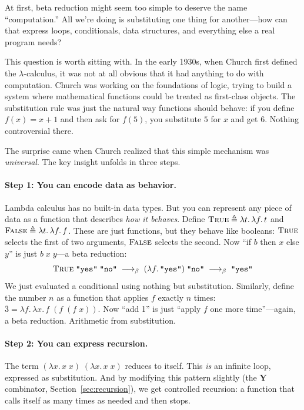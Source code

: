 \documentclass[11pt,a4paper]{article}
\theoremstyle{definition}
\newcommand{\lam}{\lambda}
\newcommand{\reduce}{\longrightarrow_\beta}
\newcommand{\church}[1]{\overline{#1}}
\newcommand{\TR}{\textsc{True}}
\newcommand{\FL}{\textsc{False}}
\begin{document}
At first, beta reduction might seem too simple to deserve the name
``computation.'' All we're doing is substituting one thing for another---how
can that express loops, conditionals, data structures, and everything else a
real program needs?

This question is worth sitting with. In the early 1930s, when Church first defined the
$\lam$-calculus, it was not at all obvious that it had anything to do with
computation. Church was working on the foundations of logic, trying to build
a system where mathematical functions could be treated as first-class objects.
The substitution rule was just the natural way functions should behave:
if you define $f(x) = x + 1$ and then ask for $f(5)$, you substitute $5$
for $x$ and get $6$. Nothing controversial there.

The surprise came when Church realized that this simple mechanism was
\emph{universal}. The key insight unfolds in three steps.

\paragraph{Step 1: You can encode data as behavior.}
Lambda calculus has no built-in data types. But you can represent any piece of
data as a function that describes \emph{how it behaves}. Define
$\TR \triangleq \lam t.\, \lam f.\, t$ and $\FL \triangleq \lam t.\,
\lam f.\, f$. These are just functions, but they behave like booleans:
$\TR$ selects the first of two arguments, $\FL$ selects the second.
Now ``if $b$ then $x$ else $y$'' is just $b\;x\;y$---a beta reduction:
\[
  \TR\; \texttt{"yes"}\; \texttt{"no"}
  \;\reduce\; (\lam f.\, \texttt{"yes"})\; \texttt{"no"}
  \;\reduce\; \texttt{"yes"}
\]
We just evaluated a conditional using nothing but substitution. Similarly,
define the number $n$ as a function that applies $f$ exactly $n$ times:
$\church{3} = \lam f.\, \lam x.\, f\;(f\;(f\;x))$. Now ``add 1'' is just
``apply $f$ one more time''---again, a beta reduction. Arithmetic from
substitution.

\paragraph{Step 2: You can express recursion.}
The term $(\lam x.\, x\;x)\;(\lam x.\, x\;x)$ reduces to itself. This
\emph{is} an infinite loop, expressed as substitution. And by modifying this
pattern slightly (the $\mathbf{Y}$ combinator, Section~\ref{sec:recursion}),
we get controlled recursion: a function that calls itself as many times as
needed and then stops.
\end{document}
